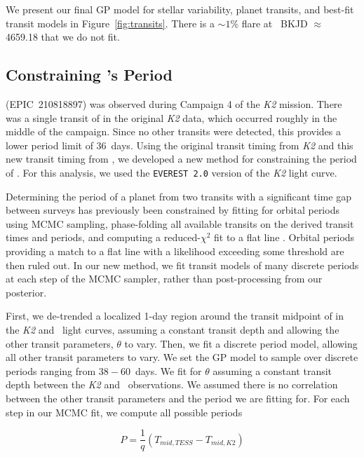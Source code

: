 \documentclass[linenumbers,modern,twocolumn]{aastex631}
\begin{document}
We present our final GP model for stellar variability, planet transits, and best-fit transit models in Figure~\ref{fig:transits}. There is a $\sim 1\%$ flare at \tess\ BKJD $\approx$ 4659.18 that we do not fit.


\subsection{Constraining \planete's Period}

\sname (EPIC~210818897) was observed during Campaign 4 of the \textit{K2} mission. There was a single transit of \planete in the original \textit{K2} data, which occurred roughly in the middle of the campaign. Since no other transits were detected, this provides a lower period limit of 36~days. Using the original transit timing from \textit{K2} and this new transit timing from \tess, we developed a new method for constraining the period of \planete. For this analysis, we used the \texttt{EVEREST 2.0} \citep{luger18} version of the \textit{K2} light curve. 

Determining the period of a planet from two transits with a significant time gap between surveys has previously been constrained by fitting for orbital periods using MCMC sampling, phase-folding all available transits on the derived transit times and periods, and computing a reduced-$\chi^2$ fit to a flat line \citep{becker19}. Orbital periods providing a match to a flat line with a likelihood exceeding some threshold are then ruled out. In our new method, we fit transit models of many discrete periods at each step of the MCMC sampler, rather than post-processing from our posterior.

First, we de-trended a localized 1-day region around the transit midpoint of \planete in the \textit{K2} and \tess\ light curves, assuming a constant transit depth and allowing the other transit parameters, $\theta$ to vary. Then, we fit a discrete period model, allowing all other transit parameters to vary. We set the GP model to sample over discrete periods ranging from $38 - 60$~days. We fit for $\theta$ assuming a constant transit depth between the \textit{K2} and \tess\ observations. We assumed there is no correlation between the other transit parameters and the period we are fitting for. For each step in our MCMC fit, we compute all possible periods

\begin{equation}\label{eq:period}
    P = \frac{1}{q} \left(T_{mid,TESS} - T_{mid, K2}\right)
\end{equation}
\end{document}
